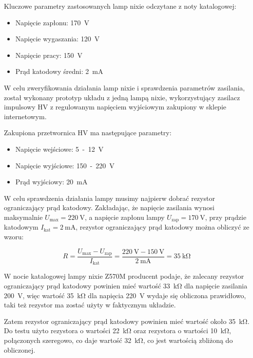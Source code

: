 \documentclass{article}
\begin{document}
Kluczowe parametry zastosowanych lamp nixie odczytane z noty katalogowej:
\begin{itemize}
    \item Napięcie zapłonu: \SI{170}{\volt}
    \item Napięcie wygaszania: \SI{120}{\volt}
    \item Napięcie pracy: \SI{150}{\volt}
    \item Prąd katodowy średni: \SI{2}{\milli\ampere}
\end{itemize}

W celu zweryfikowania działania lamp nixie i sprawdzenia parametrów zasilania, został wykonany prototyp układu z jedną lampą nixie,
wykorzystujący zasilacz impulsowy HV z regulowanym napięciem wyjściowym zakupiony w sklepie internetowym.

Zakupiona przetwornica HV ma następujące parametry:
\begin{itemize}
    \item Napięcie wejściowe: \SI{5}-\SI{12}{\volt}
    \item Napięcie wyjściowe: \SI{150}-\SI{220}{\volt}
    \item Prąd wyjściowy: \SI{20}{\milli\ampere}
\end{itemize}

W celu sprawdzenia działania lampy musimy najpierw dobrać rezystor ograniczający prąd katodowy.
Zakładając, że napięcie zasilania wynosi maksymalnie $U_{\text{max}} = \SI{220}{\volt}$, a napięcie zapłonu lampy $U_{\text{zap}} = \SI{170}{\volt}$,
przy prądzie katodowym $I_{\text{kat}} = \SI{2}{\milli\ampere}$, rezystor ograniczający prąd katodowy można obliczyć ze wzoru:

\begin{equation}
    R = \frac{U_{\text{max}} - U_{\text{zap}}}{I_{\text{kat}}} = \frac{\SI{220}{\volt} - \SI{150}{\volt}}{\SI{2}{\milli\ampere}} = \SI{35}{\kilo\ohm}
\end{equation}

W nocie katalogowej lampy nixie Z570M producent podaje, że zalecany rezystor ograniczający prąd katodowy 
powinien mieć wartość \SI{33}{\kilo\ohm} dla napięcie zasilania \SI{200}{\volt}, więc wartość \SI{35}{\kilo\ohm} dla napięcia \SI{220}{\volt}
wydaje się obliczona prawidłowo, taki też rezystor ma zostać użyty w faktycznym układzie.

Zatem rezystor ograniczający prąd katodowy powinien mieć wartość około \SI{35}{\kilo\ohm}.
Do testu użyto rezystora o wartości \SI{22}{\kilo\ohm} oraz rezystora o wartości \SI{10}{\kilo\ohm}, połączonych
szeregowo, co daje wartość \SI{32}{\kilo\ohm}, co jest wartością zbliżoną do obliczonej.
\end{document}
